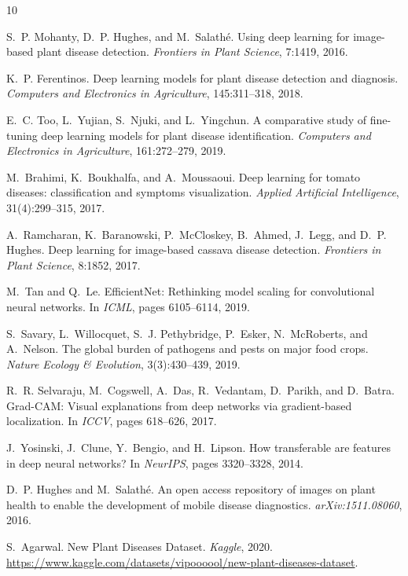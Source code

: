 \documentclass[12pt, a4paper]{article}
\begin{document}

\begin{thebibliography}{10}

S.~P. Mohanty, D.~P. Hughes, and M.~Salath{\'e}.
\newblock Using deep learning for image-based plant disease detection.
\newblock \emph{Frontiers in Plant Science}, 7:1419, 2016.

K.~P. Ferentinos.
\newblock Deep learning models for plant disease detection and diagnosis.
\newblock \emph{Computers and Electronics in Agriculture}, 145:311--318, 2018.

E.~C. Too, L.~Yujian, S.~Njuki, and L.~Yingchun.
\newblock A comparative study of fine-tuning deep learning models for plant disease identification.
\newblock \emph{Computers and Electronics in Agriculture}, 161:272--279, 2019.

M.~Brahimi, K.~Boukhalfa, and A.~Moussaoui.
\newblock Deep learning for tomato diseases: classification and symptoms visualization.
\newblock \emph{Applied Artificial Intelligence}, 31(4):299--315, 2017.

A.~Ramcharan, K.~Baranowski, P.~McCloskey, B.~Ahmed, J.~Legg, and D.~P. Hughes.
\newblock Deep learning for image-based cassava disease detection.
\newblock \emph{Frontiers in Plant Science}, 8:1852, 2017.

M.~Tan and Q.~Le.
\newblock EfficientNet: Rethinking model scaling for convolutional neural networks.
\newblock In \emph{ICML}, pages 6105--6114, 2019.

S.~Savary, L.~Willocquet, S.~J. Pethybridge, P.~Esker, N.~McRoberts, and A.~Nelson.
\newblock The global burden of pathogens and pests on major food crops.
\newblock \emph{Nature Ecology \& Evolution}, 3(3):430--439, 2019.

R.~R. Selvaraju, M.~Cogswell, A.~Das, R.~Vedantam, D.~Parikh, and D.~Batra.
\newblock Grad-CAM: Visual explanations from deep networks via gradient-based localization.
\newblock In \emph{ICCV}, pages 618--626, 2017.

J.~Yosinski, J.~Clune, Y.~Bengio, and H.~Lipson.
\newblock How transferable are features in deep neural networks?
\newblock In \emph{NeurIPS}, pages 3320--3328, 2014.

D.~P. Hughes and M.~Salath{\'e}.
\newblock An open access repository of images on plant health to enable the development of mobile disease diagnostics.
\newblock \emph{arXiv:1511.08060}, 2016.

S.~Agarwal.
\newblock New Plant Diseases Dataset.
\newblock \emph{Kaggle}, 2020.
\newblock \url{https://www.kaggle.com/datasets/vipoooool/new-plant-diseases-dataset}.

\end{thebibliography}
\end{document}

